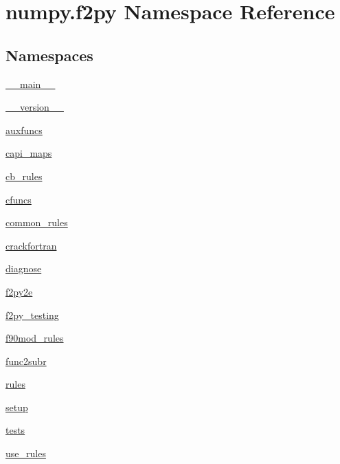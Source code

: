 \hypertarget{namespacenumpy_1_1f2py}{}\section{numpy.\+f2py Namespace Reference}
\label{namespacenumpy_1_1f2py}
\subsection*{Namespaces}
\begin{DoxyCompactItemize}
\item 
 \hyperlink{namespacenumpy_1_1f2py_1_1____main____}{\+\_\+\+\_\+main\+\_\+\+\_\+}
\item 
 \hyperlink{namespacenumpy_1_1f2py_1_1____version____}{\+\_\+\+\_\+version\+\_\+\+\_\+}
\item 
 \hyperlink{namespacenumpy_1_1f2py_1_1auxfuncs}{auxfuncs}
\item 
 \hyperlink{namespacenumpy_1_1f2py_1_1capi__maps}{capi\+\_\+maps}
\item 
 \hyperlink{namespacenumpy_1_1f2py_1_1cb__rules}{cb\+\_\+rules}
\item 
 \hyperlink{namespacenumpy_1_1f2py_1_1cfuncs}{cfuncs}
\item 
 \hyperlink{namespacenumpy_1_1f2py_1_1common__rules}{common\+\_\+rules}
\item 
 \hyperlink{namespacenumpy_1_1f2py_1_1crackfortran}{crackfortran}
\item 
 \hyperlink{namespacenumpy_1_1f2py_1_1diagnose}{diagnose}
\item 
 \hyperlink{namespacenumpy_1_1f2py_1_1f2py2e}{f2py2e}
\item 
 \hyperlink{namespacenumpy_1_1f2py_1_1f2py__testing}{f2py\+\_\+testing}
\item 
 \hyperlink{namespacenumpy_1_1f2py_1_1f90mod__rules}{f90mod\+\_\+rules}
\item 
 \hyperlink{namespacenumpy_1_1f2py_1_1func2subr}{func2subr}
\item 
 \hyperlink{namespacenumpy_1_1f2py_1_1rules}{rules}
\item 
 \hyperlink{namespacenumpy_1_1f2py_1_1setup}{setup}
\item 
 \hyperlink{namespacenumpy_1_1f2py_1_1tests}{tests}
\item 
 \hyperlink{namespacenumpy_1_1f2py_1_1use__rules}{use\+\_\+rules}
\end{DoxyCompactItemize}
